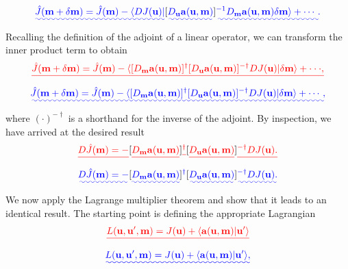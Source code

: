 \documentclass[a4paper,12pt]{paper}
\providecommand{\DIFadd}[1]{{\protect\color{blue}\uwave{#1}}} %
\providecommand{\DIFdel}[1]{{\protect\color{red}\sout{#1}}}                      %
\providecommand{\DIFaddbegin}{} %
\providecommand{\DIFaddend}{} %
\providecommand{\DIFdelbegin}{} %
\providecommand{\DIFdelend}{} %
\begin{document}
\DIFdelend \DIFaddbegin \begin{equation}
\DIFadd{\hat{J}(\mathbf{m}+\delta \mathbf{m})=\hat{J}(\mathbf{m})-\langle DJ(\mathbf{u})|
}[\DIFadd{D_{\mathbf{u}}\mathbf{a}(\mathbf{u},\mathbf{m})}]\DIFadd{^{-1}D_{\mathbf{m}}\mathbf{a}(\mathbf{u},\mathbf{m})\delta \mathbf{m}\rangle+\cdots.
\label{eq:52}
}\end{equation}\DIFaddend 
Recalling the definition of the adjoint of a linear operator, we can transform the inner product term to obtain
\DIFdelbegin \begin{displaymath}
\DIFdel{\hat{J}(\mathbf{m}+\delta \mathbf{m})=\hat{J}(\mathbf{m})-\langle[D_{\mathbf{m}}
\mathbf{a}(\mathbf{u},\mathbf{m})]^{\dagger}[D_{\mathbf{u}}\mathbf{a}(\mathbf{u},\mathbf{m})]^{-\dagger}DJ
(\mathbf{u})|\delta \mathbf{m}\rangle+\cdot\cdot\cdot,
}\end{displaymath}%
\DIFdelend \DIFaddbegin \begin{equation}
\DIFadd{\hat{J}(\mathbf{m}+\delta \mathbf{m})=\hat{J}(\mathbf{m})-\langle[D_{\mathbf{m}}
\mathbf{a}(\mathbf{u},\mathbf{m})]^{\dagger}[D_{\mathbf{u}}\mathbf{a}(\mathbf{u},\mathbf{m})]^{-\dagger}DJ
(\mathbf{u})|\delta \mathbf{m}\rangle+\cdots,
\label{eq:53}
}\end{equation}\DIFaddend 
where $(\cdot)^{-\dagger}$ is a shorthand for the inverse of the adjoint. By inspection, we have arrived at the desired result
\DIFdelbegin \begin{displaymath}
\DIFdel{D\hat{J}(\mathbf{m})=-}[\DIFdel{D_{\mathbf{m}}\mathbf{a}(\mathbf{u},\mathbf{m})}]\DIFdel{^{\dagger}
}[\DIFdel{D_{\mathbf{u}}\mathbf{a}(\mathbf{u},\mathbf{m})}]\DIFdel{^{-\dagger}DJ(\mathbf{u}).
}\end{displaymath}%
\DIFdelend \DIFaddbegin \begin{equation}
\DIFadd{D\hat{J}(\mathbf{m})=-}[\DIFadd{D_{\mathbf{m}}\mathbf{a}(\mathbf{u},\mathbf{m})}]\DIFadd{^{\dagger}
}[\DIFadd{D_{\mathbf{u}}\mathbf{a}(\mathbf{u},\mathbf{m})}]\DIFadd{^{-\dagger}DJ(\mathbf{u}).
\label{eq:54}
}\end{equation}\DIFaddend 
We now apply the Lagrange multiplier theorem and show that it leads to an identical result. The starting point is defining the appropriate Lagrangian
\DIFdelbegin \begin{displaymath}
\DIFdel{L(\mathbf{u},\mathbf{u}',\mathbf{m})=J(\mathbf{u})+\langle \mathbf{a}(\mathbf{u},\mathbf{m})|\mathbf{u}'\rangle
}\end{displaymath}%
\DIFdelend \DIFaddbegin \begin{equation}
\DIFadd{L(\mathbf{u},\mathbf{u}',\mathbf{m})=J(\mathbf{u})+\langle \mathbf{a}(\mathbf{u},\mathbf{m})|\mathbf{u}'\rangle,
\label{eq:55}
}\end{equation}\DIFaddend 
\end{document}
